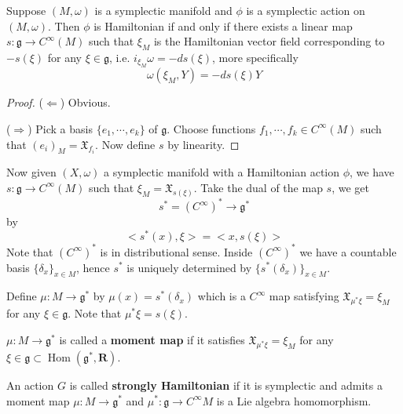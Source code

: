 \documentclass[
11pt, %
letterpaper， %
oneside, %
headinclude,footinclude, %
BCOR5mm, %
]{scrartcl}
\newcommand{\R}{{\mathbf{R}}}
\newcommand{\ho}{\operatorname{Hom}}
\newcommand{\bfs}{\textbf}
\begin{document}
\begin{lem}
	Suppose $(M,\omega)$ is a symplectic manifold and $\phi$ is a symplectic action on $(M,\omega)$. Then $\phi$ is Hamiltonian if and only if there exists a linear map $s: \mathfrak{g} \to C^{\infty}(M)$ such that $\xi_M$ is the Hamiltonian vector field corresponding to $-s(\xi)$ for any $\xi\in \mathfrak{g}$, i.e. $	i_{\xi_M}\omega=-ds(\xi)$, more specifically
	\begin{equation*}
    \omega(\xi_M, Y)=-ds(\xi) Y
	\end{equation*}
	
\end{lem}
\begin{proof}
	($\Leftarrow$) Obvious.
	
	($\Rightarrow$) Pick a basis $\{e_1, \cdots, e_k\}$ of $\mathfrak{g}$. Choose functions $f_1, \cdots, f_k \in C^{\infty}(M)$ such that $(e_i)_M=\mathfrak{X}_{f_i}$. Now define $s$ by linearity.
\end{proof}

Now given $(X,\omega)$ a symplectic manifold with a Hamiltonian action $\phi$, we have $s:\mathfrak{g} \to C^{\infty}(M)$ such that $\xi_M=\mathfrak{X}_{s(\xi)}$. Take the dual of the map $s$, we get
\begin{equation*}
s^*=(C^{\infty})^*\to \mathfrak{g}^*
\end{equation*}
by 
\begin{equation*}
<s^*(x),\xi>=<x,s(\xi)>
\end{equation*}
Note that $(C^{\infty})^*$ is in distributional sense. Inside $(C^{\infty})^*$ we have a countable basis $\{\delta_x \}_{x\in M}$, hence $s^*$ is uniquely determined by $\{s^*(\delta_x) \}_{x\in M}$.


Define $\mu: M\to \mathfrak{g}^*$ by $\mu(x)= s^*(\delta_x)$ which is a $C^{\infty}$ map satisfying $\mathfrak{X}_{\mu^*\xi }=\xi_M$ for any $\xi\in \mathfrak{g}$. Note that $\mu^*\xi= s(\xi)$.

\begin{definition}
	$\mu: M\to \mathfrak{g}^*$ is called a \bfs{moment map} if it satisfies $\mathfrak{X}_{\mu^*\xi }=\xi_M$ for any $\xi\in \mathfrak{g}\subset \ho(\mathfrak{g}^*, \R)$.
\end{definition}
\begin{definition}
	An action $G$ is called \bfs{strongly Hamiltonian} if it is symplectic and admits a moment map $\mu: M\to \mathfrak{g}^*$ and $\mu^*:\mathfrak{g} \to C^{\infty} M$ is a Lie algebra homomorphism.
\end{definition}
\end{document}

